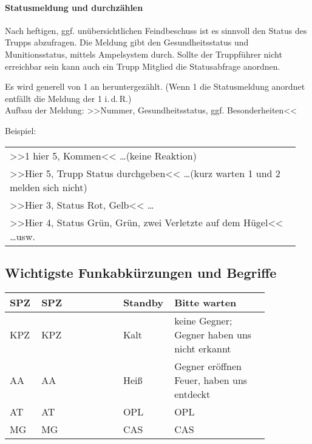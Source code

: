 	\paragraph*{Statusmeldung und durchzählen}
	\label{sec:Status}
	Nach heftigen, ggf. unübersichtlichen Feindbeschuss ist es sinnvoll den Status des Trupps abzufragen. Die Meldung gibt den Gesundheitsstatus und Munitionsstatus, mittels Ampelsystem durch. Sollte der Truppführer nicht erreichbar sein kann auch ein Trupp Mitglied die Statusabfrage anordnen.\par
	Es wird generell von 1 an heruntergezählt. (Wenn 1 die Statusmeldung anordnet entfällt die Meldung der 1 i.\,d.\,R.)  \\
	Aufbau der Meldung: >>Nummer, Gesundheitsstatus, ggf. Besonderheiten<<
	\par\medskip
	Beispiel:
	\begin{longtable}{P{0.95\linewidth}}
	\toprule
	>>1 hier 5, Kommen<< \dots (keine Reaktion)\\  
	>>Hier 5, Trupp Status durchgeben<< \dots (kurz warten 1 und 2 melden sich nicht)\\ 
	\rcg >>Hier 3, Status Rot, Gelb<< \dots\\ 
	\rcgg >>Hier 4, Status Grün, Grün, zwei Verletzte auf dem Hügel<< \dots usw.\\
	\bottomrule
	\end{longtable}		

\subsection{Wichtigste Funkabkürzungen und Begriffe}
	\begin{longtable}{p{0.1\linewidth}p{0.25\linewidth}p{0.05\linewidth}p{0.1\linewidth}p{0.35\linewidth}} 
		\toprule
		\acs{SPZ}	& \acl{SPZ}	&& Standby	& Bitte warten \hfil\\ 
		\midrule
		\acs{KPZ}	& \acl{KPZ}	&& Kalt		& keine Gegner; Gegner haben uns nicht erkannt\\ 
		\acs{AA}	& \acl{AA}	&& Heiß 		& Gegner eröffnen Feuer, haben uns entdeckt \\ 
		\acs{AT}	& \acl{AT}	&& \acs{OPL}	& \acl{OPL} \\ 
		\acs{MG}	& \acl{MG}	&& \acs{CAS}	& \acl{CAS} \\ 
		\bottomrule
	\end{longtable}


